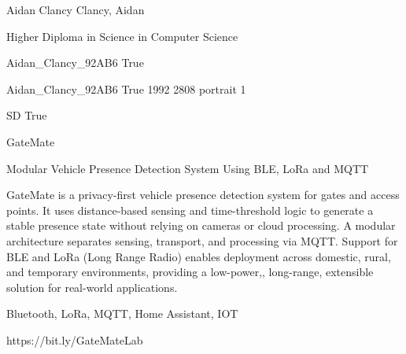 
\begingroup{}\relax



\def\Key{Aidan_Clancy_92AB6}

{Aidan Clancy}
{Clancy, Aidan}

{Higher Diploma in Science in Computer Science}

{Aidan_Clancy_92AB6}
{True}

{Aidan_Clancy_92AB6}
{True}
{1992}
{2808}
{portrait}
{1}

{SD}
{True}

{GateMate}

{Modular Vehicle Presence Detection System Using BLE, LoRa and MQTT}

{GateMate is a privacy-first vehicle presence detection system for gates and access points. It uses distance-based sensing and time-threshold logic to generate a stable presence state without relying on cameras or cloud processing. A modular architecture separates sensing, transport, and processing via MQTT. Support for BLE and LoRa (Long Range Radio) enables deployment across domestic, rural, and temporary environments, providing a low-power,, long-range, extensible solution for real-world applications.}

{Bluetooth, LoRa, MQTT, Home Assistant, IOT}

{https://bit.ly/GateMateLab}

